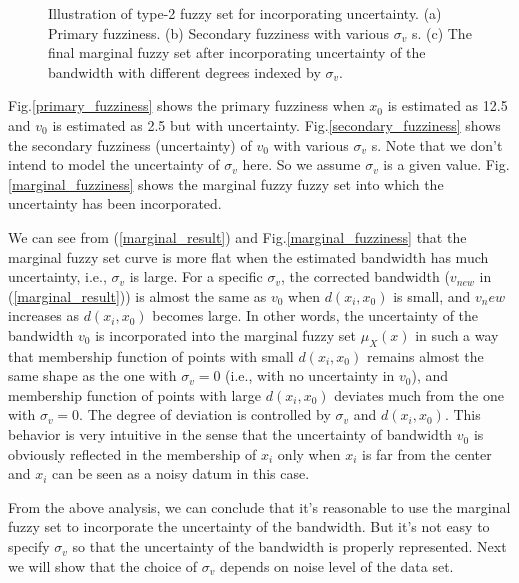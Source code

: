 \documentclass[journal]{IEEEtran}
\begin{document}
\begin{figure}[!t]
   \centering
   \label{illustrate_bandwidth_marginal}
\caption{Illustration  of type-2 fuzzy set for incorporating uncertainty. (a) Primary fuzziness. (b) Secondary fuzziness with various $\sigma_v$ s. (c) The final marginal fuzzy set after incorporating  uncertainty of the bandwidth with different degrees indexed by $\sigma_v$.}
\label{type2_fs_uncertainty}
\end{figure}
Fig.\ref{primary_fuzziness} shows the primary fuzziness when $x_0$ is estimated as 12.5 and $v_0$ is estimated as 2.5 but with uncertainty. Fig.\ref{secondary_fuzziness} shows the secondary fuzziness (uncertainty) of $v_0$ with various $\sigma_v$ s. Note that we don't intend to model the uncertainty of $\sigma_v$ here. So we assume $\sigma_v$ is a given value. Fig.\ref{marginal_fuzziness} shows the marginal fuzzy fuzzy set into which the uncertainty has been incorporated.

We can see from (\ref{marginal_result}) and Fig.\ref{marginal_fuzziness} that 
the marginal fuzzy set curve is more flat when the estimated bandwidth has much uncertainty, i.e., $\sigma_v$ is large.
For a specific $\sigma_v$, the corrected bandwidth ($v_{new}$ in (\ref{marginal_result})) is almost the same as $v_0$ when $d(x_i,x_0)$ is small, and $v_new$ increases as $d(x_i,x_0)$ becomes large.
In other words, the uncertainty of the bandwidth $v_0$ is incorporated into the marginal fuzzy set $\mu_X(x)$ in such a way that membership function of points with small $d(x_i,x_0)$ remains almost the same shape as the one with $\sigma_v=0$ (i.e., with no uncertainty in $v_0$), and membership function of points with large $d(x_i,x_0)$ deviates much from the one with $\sigma_v=0$. The degree of deviation is controlled by $\sigma_v$ and $d(x_i,x_0)$. This behavior is very intuitive in the sense that the uncertainty of bandwidth $v_0$ is obviously reflected in the membership of $x_i$ only when $x_i$ is far from the center and $x_i$ can be seen as a noisy datum in this case. 

From the above analysis, we can conclude that it's reasonable to use the marginal fuzzy set to incorporate the uncertainty of the bandwidth. But it's not easy to specify $\sigma_v$ so that the uncertainty of the bandwidth is properly represented. Next we will show that the choice of $\sigma_v$ depends on noise level of the data set.
\end{document}
